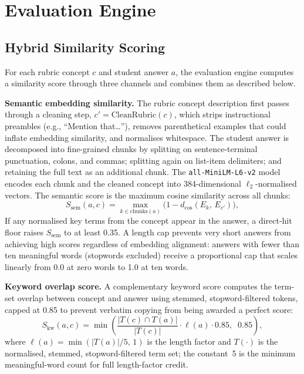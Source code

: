 \documentclass[conference]{IEEEtran}
\begin{document}
\section{Evaluation Engine}

\subsection{Hybrid Similarity Scoring}

For each rubric concept $c$ and student answer $a$, the evaluation
engine computes a similarity score through three channels and
combines them as described below.

\textbf{Semantic embedding similarity.} The rubric concept
description first passes through a cleaning step,
$c' = \mathrm{CleanRubric}(c)$, which strips instructional
preambles (e.g., ``Mention that\ldots''), removes parenthetical
examples that could inflate embedding similarity, and normalises
whitespace. The student answer is decomposed into fine-grained
chunks by splitting on sentence-terminal punctuation, colons, and
commas; splitting again on list-item delimiters; and retaining the
full text as an additional chunk. The \texttt{all-MiniLM-L6-v2}
model encodes each chunk and the cleaned concept into 384-dimensional
$\ell_2$-normalised vectors. The semantic score is the maximum
cosine similarity across all chunks:
\begin{equation}
  S_{\mathrm{sem}}(a,c)=
  \max_{k \in \mathrm{chunks}(a)}
  \bigl(1 - d_{\cos}(E_k,\,E_{c'})\bigr),
  \label{eq:ssem}
\end{equation}
If any normalised key terms from the concept appear in the answer,
a direct-hit floor raises $S_{\mathrm{sem}}$ to at least 0.35. A
length cap prevents very short answers from achieving high scores
regardless of embedding alignment: answers with fewer than ten
meaningful words (stopwords excluded) receive a proportional
cap that scales linearly from 0.0 at zero words to 1.0 at ten words.

\textbf{Keyword overlap score.} A complementary keyword score
computes the term-set overlap between concept and answer using
stemmed, stopword-filtered tokens, capped at 0.85 to prevent
verbatim copying from being awarded a perfect score:
\begin{equation}
  S_{\mathrm{kw}}(a,c)=
  \min\!\left(
    \frac{|T(c)\cap T(a)|}{|T(c)|}
    \cdot\ell(a)
    \cdot 0.85,\;\; 0.85
  \right)\!,
  \label{eq:skw}
\end{equation}
where $\ell(a)=\min(|T(a)|/5,\,1)$ is the length factor
and $T(\cdot)$ is the normalised, stemmed, stopword-filtered
term set; the constant~5 is the minimum meaningful-word count
for full length-factor credit.
\end{document}
